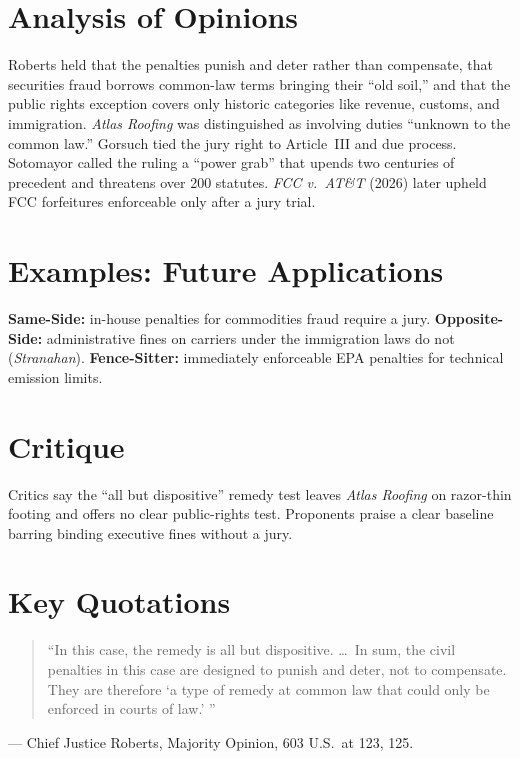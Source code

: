 \documentclass[12pt]{article}
\begin{document}
\section{Analysis of Opinions}
Roberts held that the penalties punish and deter rather than compensate, that securities fraud borrows common-law terms bringing their ``old soil,'' and that the public rights exception covers only historic categories like revenue, customs, and immigration. \textit{Atlas Roofing} was distinguished as involving duties ``unknown to the common law.'' Gorsuch tied the jury right to Article~III and due process. Sotomayor called the ruling a ``power grab'' that upends two centuries of precedent and threatens over 200 statutes. \textit{FCC v.\ AT\&T} (2026) later upheld FCC forfeitures enforceable only after a jury trial.

\section{Examples: Future Applications}
\textbf{Same-Side:} in-house penalties for commodities fraud require a jury. \textbf{Opposite-Side:} administrative fines on carriers under the immigration laws do not (\textit{Stranahan}). \textbf{Fence-Sitter:} immediately enforceable EPA penalties for technical emission limits.

\section{Critique}
Critics say the ``all but dispositive'' remedy test leaves \textit{Atlas Roofing} on razor-thin footing and offers no clear public-rights test. Proponents praise a clear baseline barring binding executive fines without a jury.

\section{Key Quotations}
\begin{quote}
``In this case, the remedy is all but dispositive. \ldots\ In sum, the civil penalties in this case are designed to punish and deter, not to compensate. They are therefore `a type of remedy at common law that could only be enforced in courts of law.' ''
\end{quote}
\noindent --- Chief Justice Roberts, Majority Opinion, 603 U.S.\ at 123, 125.
\end{document}

